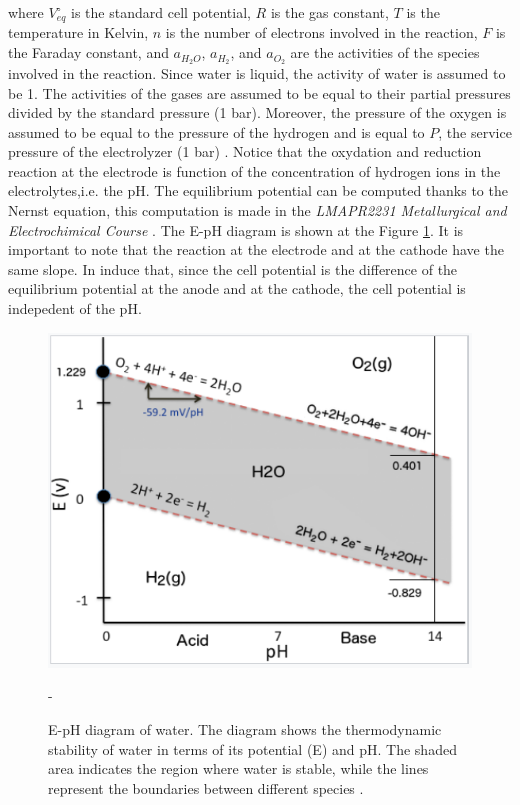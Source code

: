 \begin{minipage}{0.6\textwidth}
where $V^{\circ}_{eq}$ is the standard cell potential, $R$ is the gas constant, $T$ is the temperature in Kelvin, $n$ is the number of electrons involved in the reaction, $F$ is the Faraday constant, and $a_{H_2O}$, $a_{H_2}$, and $a_{O_2}$ are the activities of the species involved in the reaction. Since water is liquid, the activity of water is assumed to be 1. The activities of the gases are assumed to be equal to their partial pressures divided by the standard pressure (1 bar). Moreover, the pressure of the oxygen is assumed to be equal to the pressure of the hydrogen and is equal to $P$, the service pressure of the electrolyzer (1 bar) \cite{SocChimFr1995}. Notice that the oxydation and reduction reaction at the electrode is function of the concentration of hydrogen ions in the electrolytes,i.e. the pH. The equilibrium potential can be computed thanks to the Nernst equation, this computation is made in the \textit{LMAPR2231 Metallurgical and Electrochimical Course} \cite{uclouvain_lmapr2231}. 
The E-pH diagram is shown at the Figure \ref{fig:PEM_fuel_cell}. It is important to note that the reaction at the electrode and at the cathode have the same slope. In induce that, since the cell potential is the difference of the equilibrium potential at the anode and at the cathode, the cell potential is indepedent of the pH.
\end{minipage}
\hfill
\begin{minipage}{0.35\textwidth}
\begin{figure}[H]
    \centering
    \includegraphics[width=\textwidth]{Figures/Pourbaix_water.png}
    \caption{E-pH diagram of water. The diagram shows the thermodynamic stability of water in terms of its potential (E) and pH. The shaded area indicates the region where water is stable, while the lines represent the boundaries between different species \cite{LibreTextsElectrochemicalPotentials}.}
    \label{fig:PEM_fuel_cell}
    -
\end{figure}
\end{minipage}

